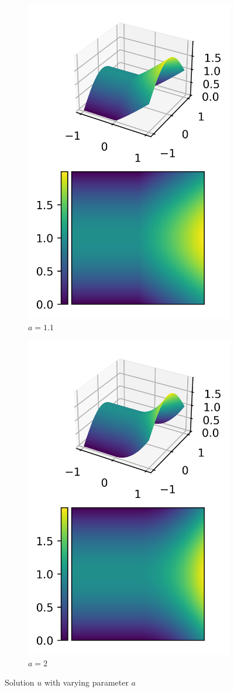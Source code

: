 \documentclass[11pt,a4paper]{article}
\begin{document}
\begin{figure}
  \centering
  \begin{subfigure}{.5\textwidth}
    \centering
    \includegraphics[width=.6\linewidth]{contour_nonsmooth_1}
    \caption{$a = 1.1$}
  \end{subfigure}%
  \begin{subfigure}{.5\textwidth}
    \centering
    \includegraphics[width=.6\linewidth]{contour_nonsmooth_2}
    \caption{$a = 2$}
  \end{subfigure}
  \caption{Solution $u$ with varying parameter $a$}
  \label{fig:non_smooth_mixed_solution}
\end{figure}
\end{document}
